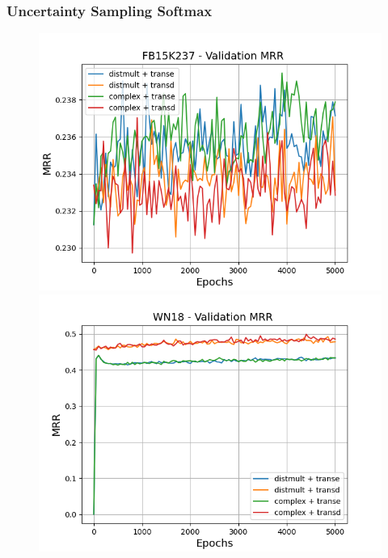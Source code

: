 \subsubsection{Uncertainty Sampling Softmax}

\begin{figure}
    \centering
    \begin{minipage}{.3\textwidth}
      \centering
      \includegraphics[width=\linewidth]{figures/results/gan_train/pretrained/uncertainty/max_distribution/entropy/fb15k237/gan_train_uncertainty_fb15k237_mrrs.png}
    \end{minipage}%
    \begin{minipage}{.3\textwidth}
      \centering
      \includegraphics[width=\linewidth]{figures/results/gan_train/pretrained/uncertainty/max_distribution/entropy/wn18/gan_train_uncertainty_wn18_mrrs.png}

\end{minipage}
\end{figure}
